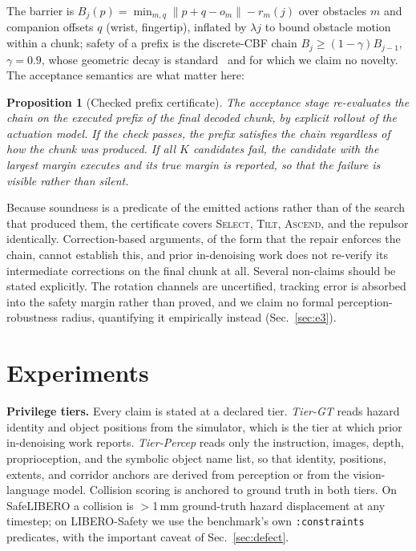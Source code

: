 \documentclass[conference]{IEEEtran}
\newtheorem{proposition}{Proposition}
\begin{document}
The barrier is $B_j(p)=\min_{m,q}\lVert p+q-o_m\rVert-r_m(j)$ over obstacles $m$ and companion offsets $q$ (wrist, fingertip), inflated by $\lambda j$ to bound obstacle motion within a chunk; safety of a prefix is the discrete-CBF chain $B_j\ge(1-\gamma)B_{j-1}$, $\gamma=0.9$, whose geometric decay is standard~\cite{agrawal2017dcbf} and for which we claim no novelty. The acceptance semantics are what matter here:

\begin{proposition}[Checked prefix certificate]\label{prop:cert}
The acceptance stage re-evaluates the chain on the executed prefix of the final decoded chunk, by explicit rollout of the actuation model. If the check passes, the prefix satisfies the chain regardless of how the chunk was produced. If all $K$ candidates fail, the candidate with the largest margin executes and its true margin is reported, so that the failure is visible rather than silent.
\end{proposition}

Because soundness is a predicate of the emitted actions rather than of the search that produced them, the certificate covers \textsc{Select}, \textsc{Tilt}, \textsc{Ascend}, and the repulsor identically. Correction-based arguments, of the form that the repair enforces the chain, cannot establish this, and prior in-denoising work does not re-verify its intermediate corrections on the final chunk at all. Several non-claims should be stated explicitly. The rotation channels are uncertified, tracking error is absorbed into the safety margin rather than proved, and we claim no formal perception-robustness radius, quantifying it empirically instead (Sec.~\ref{sec:e3}).

\section{Experiments}
\label{sec:exp}

\textbf{Privilege tiers.} Every claim is stated at a declared tier. \textit{Tier-GT} reads hazard identity and object positions from the simulator, which is the tier at which prior in-denoising work reports. \textit{Tier-Percep} reads only the instruction, images, depth, proprioception, and the symbolic object name list, so that identity, positions, extents, and corridor anchors are derived from perception or from the vision-language model. Collision scoring is anchored to ground truth in both tiers. On SafeLIBERO a collision is $>$1\,mm ground-truth hazard displacement at any timestep; on LIBERO-Safety we use the benchmark's own \texttt{:constraints} predicates, with the important caveat of Sec.~\ref{sec:defect}.
\end{document}
